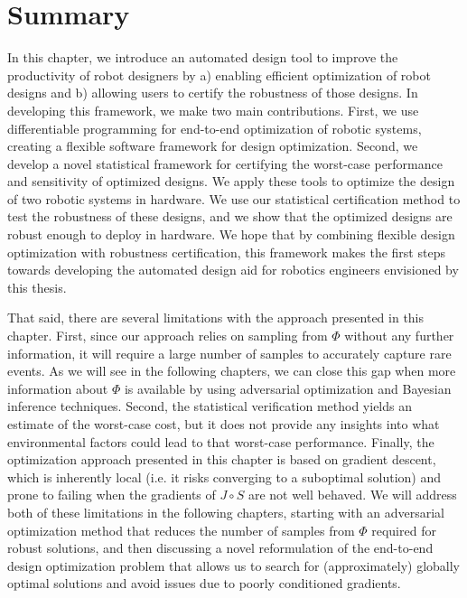 \section{Summary}

In this chapter, we introduce an automated design tool to improve the productivity of robot designers by a) enabling efficient optimization of robot designs and b) allowing users to certify the robustness of those designs. In developing this framework, we make two main contributions. First, we use differentiable programming for end-to-end optimization of robotic systems, creating a flexible software framework for design optimization. Second, we develop a novel statistical framework for certifying the worst-case performance and sensitivity of optimized designs.
%
We apply these tools to optimize the design of two robotic systems in hardware. We use our statistical certification method to test the robustness of these designs, and we show that the optimized designs are robust enough to deploy in hardware. We hope that by combining flexible design optimization with robustness certification, this framework makes the first steps towards developing the automated design aid for robotics engineers envisioned by this thesis.

That said, there are several limitations with the approach presented in this chapter. First, since our approach relies on sampling from $\Phi$ without any further information, it will require a large number of samples to accurately capture rare events. As we will see in the following chapters, we can close this gap when more information about $\Phi$ is available by using adversarial optimization and Bayesian inference techniques. Second, the statistical verification method yields an estimate of the worst-case cost, but it does not provide any insights into what environmental factors could lead to that worst-case performance. Finally, the optimization approach presented in this chapter is based on gradient descent, which is inherently local (i.e. it risks converging to a suboptimal solution) and prone to failing when the gradients of $J\circ S$ are not well behaved. We will address both of these limitations in the following chapters, starting with an adversarial optimization method that reduces the number of samples from $\Phi$ required for robust solutions, and then discussing a novel reformulation of the end-to-end design optimization problem that allows us to search for (approximately) globally optimal solutions and avoid issues due to poorly conditioned gradients.